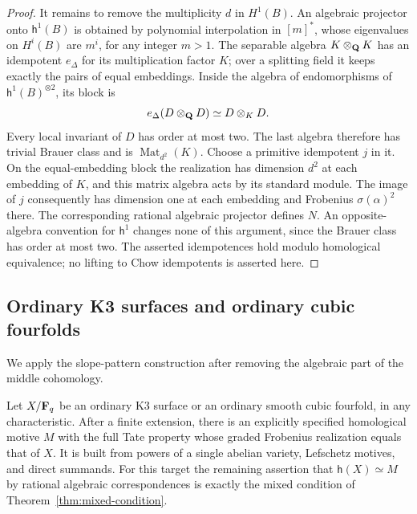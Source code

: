 \begin{proof}
It remains to remove the multiplicity $d$ in $H^1(B)$.
An algebraic projector onto $\mathsf h^1(B)$ is obtained by
polynomial interpolation in $[m]^*$, whose eigenvalues on
$H^i(B)$ are $m^i$, for any integer $m>1$.
The separable algebra $K\otimes_\mathbf Q K$ has an idempotent
$e_\Delta$ for its multiplication factor $K$; over a splitting
field it keeps exactly the pairs of equal embeddings.
Inside the algebra of endomorphisms of
$\mathsf h^1(B)^{\otimes2}$, its block is
\[
 e_\Delta(D\otimes_\mathbf Q D)\simeq D\otimes_K D.
\]
Every local invariant of $D$ has order at most two. The last
algebra therefore has trivial Brauer class and is
$\operatorname{Mat}_{d^2}(K)$. Choose a primitive idempotent $j$
in it. On the equal-embedding block the realization has dimension
$d^2$ at each embedding of $K$, and this matrix algebra acts by
its standard module. The image of $j$ consequently has dimension
one at each embedding and Frobenius $\sigma(\alpha)^2$ there.
The corresponding rational algebraic projector defines $N$.
An opposite-algebra convention for $\mathsf h^1$ changes none of
this argument, since the Brauer class has order at most two.
The asserted idempotences hold modulo homological equivalence;
no lifting to Chow idempotents is asserted here.
\end{proof}

\subsection{Ordinary K3 surfaces and ordinary cubic fourfolds}

We apply the slope-pattern construction after removing the
algebraic part of the middle cohomology.

\begin{proposition}\label{prop:ordinary-target}
Let $X/\mathbf F_q$ be an ordinary K3 surface or an ordinary smooth cubic
fourfold, in any characteristic. After a finite extension, there is
an explicitly specified homological motive $M$ with the full Tate
property whose graded Frobenius realization equals that of $X$.
It is built from powers of a single abelian variety, Lefschetz
motives, and direct summands. For this target the remaining
assertion that $\mathsf h(X)\simeq M$ by rational algebraic
correspondences is exactly the mixed condition of
Theorem~\ref{thm:mixed-condition}.
\end{proposition}


